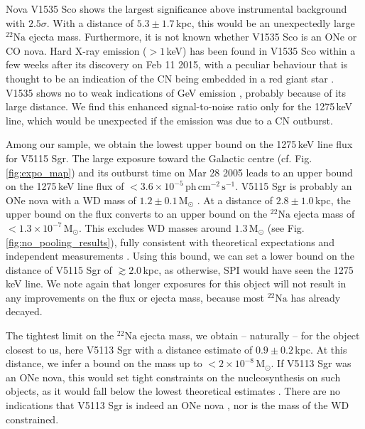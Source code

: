 \documentclass{aa}
\newcommand{\mrm}[1]{\mathrm{#1}}
\newcommand{\nuc}[2]{$\mrm{^{#2}#1}$}
\begin{document}
Nova V1535 Sco shows the largest significance above instrumental background with $2.5\sigma$.
%
With a distance of $5.3 \pm 1.7$\,kpc, this would be an unexpectedly large \nuc{Na}{22} ejecta mass.
%
Furthermore, it is not known whether V1535 Sco is an ONe or CO nova.
%
Hard X-ray emission ($> 1$\,keV) has been found in V1535 Sco within a few weeks after its discovery on Feb 11 2015, with a peculiar behaviour that is thought to be an indication of the CN being embedded in a red giant star \citep{Linford2017_V1535Sco}.
%
V1535 shows no to weak indications of GeV emission \citep{Franckowiak2018_FermiLATnovae}, probably because of its large distance.
%
We find this enhanced signal-to-noise ratio only for the 1275\,keV line, which would be unexpected if the emission was due to a CN outburst.

Among our sample, we obtain the lowest upper bound on the 1275\,keV line flux for V5115 Sgr.
%
The large exposure toward the Galactic centre (cf. Fig.\,\ref{fig:expo_map}) and its outburst time on Mar 28 2005 \citep{Nakano2005_V5115Sgr} leads to an upper bound on the 1275\,keV line flux of $<3.6 \times 10^{-5}\,\mrm{ph\,cm^{-2}\,s^{-1}}$.
%
V5115 Sgr is probably an ONe nova with a WD mass of $1.2 \pm 0.1\,\mrm{M_{\odot}}$ \citep{Hachisu2006_novae_declinelaw,Shara2018_WDmasses}.
%
At a distance of $2.8 \pm 1.0$\,kpc, the upper bound on the flux converts to an upper bound on the \nuc{Na}{22} ejecta mass of $<1.3 \times 10^{-7}\,\mrm{M_{\odot}}$.
%
This excludes WD masses around $1.3\,\mrm{M_{\odot}}$ (see Fig.\,\ref{fig:no_pooling_results}), fully consistent with theoretical expectations \citep{abcdefgh} and independent measurements \citep{Hachisu2006_novae_declinelaw}.
%
Using this bound, we can set a lower bound on the distance of V5115 Sgr of $\gtrsim 2.0$\,kpc, as otherwise, SPI would have seen the 1275\,keV line.
%
We note again that longer exposures for this object will not result in any improvements on the flux or ejecta mass, because most \nuc{Na}{22} has already decayed.

The tightest limit on the \nuc{Na}{22} ejecta mass, we obtain -- naturally -- for the object closest to us, here V5113 Sgr with a distance estimate of $0.9 \pm 0.2$\,kpc.
%
At this distance, we infer a bound on the mass up to $<2 \times 10^{-8}\,\mrm{M_{\odot}}$.
%
If V5113 Sgr was an ONe nova, this would set tight constraints on the nucleosynthesis on such objects, as it would fall below the lowest theoretical estimates \citep[e.g.][]{abcdefgh}.
%
There are no indications that V5113 Sgr is indeed an ONe nova \citep{Tanaka2011_nova_rebrightening,Mroz2015_OGLEnovacat}, nor is the mass of the WD constrained.
\end{document}
